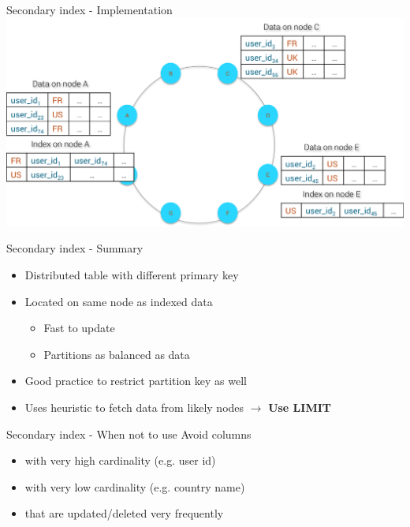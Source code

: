 \documentclass[
  10pt
]{beamer}
\begin{document}
\begin{frame}{Secondary index - Implementation \cite{datastax_secondary_index}}
  \includegraphics[width=1.0\textwidth]{resources/distributed_index.png}
\end{frame}

\begin{frame}{Secondary index - Summary \cite{datastax_secondary_index}}
  \begin{itemize}
    \item<1-> Distributed table with different primary key
    \item<2-> Located on same node as indexed data
      \begin{itemize}
        \item Fast to update
        \item Partitions as balanced as data
      \end{itemize}
    \item<3-> Good practice to restrict partition key as well
    \item<4-> Uses heuristic to fetch data from likely nodes $\rightarrow$ \textbf{Use LIMIT}
  \end{itemize}
\end{frame}

\begin{frame}{Secondary index - When not to use \cite{datastax_when_index}}
  Avoid columns
  \begin{itemize}
    \item<1-> with very high cardinality (e.g. user id)
    \item<2-> with very low cardinality (e.g. country name)
    \item<3-> that are updated/deleted very frequently
  \end{itemize}
\end{frame}
\end{document}
